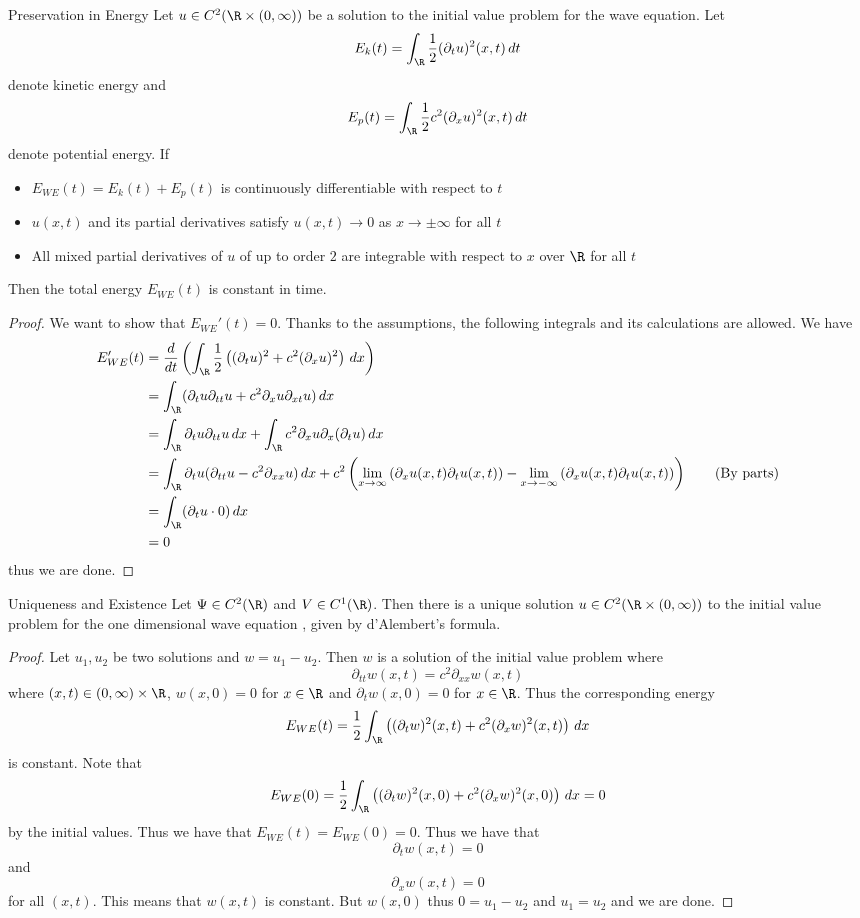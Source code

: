 \documentclass[a4paper]{article}
\begin{document}
\begin{prp}{Preservation in Energy}{} Let $u\in C^2(\R\times(0,\infty))$ be a solution to the initial value problem for the wave equation. Let $$E_k(t)=\int_\R\frac{1}{2}(\partial_tu)^2(x,t)\,dt$$ denote kinetic energy and $$E_p(t)=\int_\R\frac{1}{2}c^2(\partial_xu)^2(x,t)\,dt$$ denote potential energy. If
\begin{itemize}
\item $E_{WE}(t)=E_k(t)+E_p(t)$ is continuously differentiable with respect to $t$
\item $u(x,t)$ and its partial derivatives satisfy $u(x,t)\to 0$ as $x\to\pm\infty$ for all $t$
\item All mixed partial derivatives of $u$ of up to order $2$ are integrable with respect to $x$ over $\R$ for all $t$
\end{itemize}
Then the total energy $E_{WE}(t)$ is constant in time. \tcbline
\begin{proof}
We want to show that $E_{WE}'(t)=0$. Thanks to the assumptions, the following integrals and its calculations are allowed. We have 
\begin{align*}
E_{WE}'(t)&=\frac{d}{dt}\left(\int_\R\frac{1}{2}\left((\partial_tu)^2+c^2(\partial_xu)^2\right)\,dx\right)\\
&=\int_\R(\partial_tu\partial_{tt}u+c^2\partial_xu\partial_{xt}u)\,dx\\
&=\int_\R\partial_tu\partial_{tt}u\,dx+\int_\R c^2\partial_xu\partial_x(\partial_tu)\,dx\\
&=\int_\R\partial_tu(\partial_{tt}u-c^2\partial_{xx}u)\,dx+c^2\left(\lim_{x\to\infty}\left(\partial_xu(x,t)\partial_tu(x,t)\right)-\lim_{x\to-\infty}\left(\partial_xu(x,t)\partial_tu(x,t)\right)\right)\tag{By parts}\\
&=\int_\R(\partial_tu\cdot 0)\,dx\\
&=0
\end{align*}
thus we are done. 
\end{proof}
\end{prp}

\begin{thm}{Uniqueness and Existence}{} Let $\Psi\in C^2(\R)$ and $V\in C^1(\R)$. Then there is a unique solution $u\in C^2(\R\times(0,\infty))$ to the initial value problem for the one dimensional wave equation , given by d'Alembert's formula. \tcbline
\begin{proof}
Let $u_1,u_2$ be two solutions and $w=u_1-u_2$. Then $w$ is a solution of the initial value problem where $$\partial_{tt}w(x,t)=c^2\partial_{xx}w(x,t)$$ where $(x,t)\in(0,\infty)\times\R$, $w(x,0)=0$ for $x\in\R$ and $\partial_tw(x,0)=0$ for $x\in\R$. Thus the corresponding energy $$E_{WE}(t)=\frac{1}{2}\int_\R\left((\partial_tw)^2(x,t)+c^2(\partial_xw)^2(x,t)\right)\,dx$$ is constant. Note that $$E_{WE}(0)=\frac{1}{2}\int_\R\left((\partial_tw)^2(x,0)+c^2(\partial_xw)^2(x,0)\right)\,dx=0$$ by the initial values. Thus we have that $E_{WE}(t)=E_{WE}(0)=0$. Thus we have that $$\partial_tw(x,t)=0$$ and $$\partial_xw(x,t)=0$$ for all $(x,t)$. This means that $w(x,t)$ is constant. But $w(x,0)$ thus $0=u_1-u_2$ and $u_1=u_2$ and we are done. 
\end{proof}
\end{thm}
\end{document}
